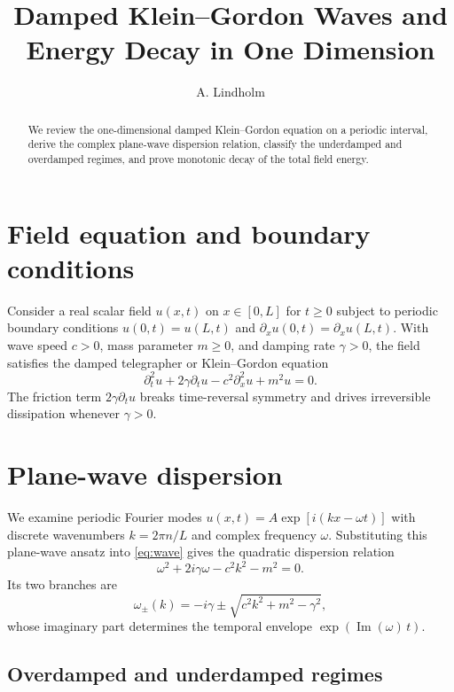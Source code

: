 \documentclass{article}
\title{Damped Klein--Gordon Waves and Energy Decay in One Dimension}
\author{A. Lindholm}
\date{}
\begin{document}
\maketitle

\begin{abstract}
We review the one-dimensional damped Klein--Gordon equation on a periodic interval,
derive the complex plane-wave dispersion relation, classify the underdamped and
overdamped regimes, and prove monotonic decay of the total field energy.
\end{abstract}

\section{Field equation and boundary conditions}\label{sec:setup}

Consider a real scalar field $u(x,t)$ on $x \in [0,L]$ for $t \geq 0$ subject to
periodic boundary conditions $u(0,t) = u(L,t)$ and $\partial_x u(0,t) = \partial_x u(L,t)$.
With wave speed $c > 0$, mass parameter $m \geq 0$, and damping rate $\gamma > 0$,
the field satisfies the damped telegrapher or Klein--Gordon equation
\begin{equation}\label{eq:wave}
  \partial_t^2 u + 2\gamma \partial_t u - c^2 \partial_x^2 u + m^2 u = 0.
\end{equation}
The friction term $2\gamma \partial_t u$ breaks time-reversal symmetry and drives
irreversible dissipation whenever $\gamma > 0$.

\section{Plane-wave dispersion}\label{sec:dispersion}

We examine periodic Fourier modes $u(x,t) = A \exp[i(kx - \omega t)]$ with discrete
wavenumbers $k = 2\pi n / L$ and complex frequency $\omega$. Substituting this
plane-wave ansatz into \eqref{eq:wave} gives the quadratic dispersion relation
\begin{equation}\label{eq:dispersion}
  \omega^2 + 2 i \gamma \omega - c^2 k^2 - m^2 = 0.
\end{equation}
Its two branches are
\[
  \omega_{\pm}(k) = -i\gamma \pm \sqrt{c^2 k^2 + m^2 - \gamma^2},
\]
whose imaginary part determines the temporal envelope $\exp(\operatorname{Im}(\omega)\,t)$.

\subsection{Overdamped and underdamped regimes}\label{subsec:overdamped}
\end{document}
